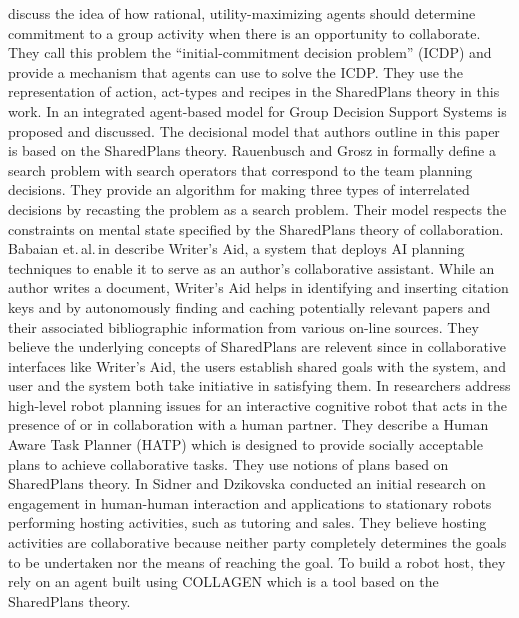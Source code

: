 \documentclass[12pt]{report}
\begin{document}
discuss the idea of how rational, utility-maximizing agents should determine
commitment to a group activity when there is an opportunity to collaborate. They
call this problem the ``initial-commitment decision problem'' (ICDP) and provide
a mechanism that agents can use to solve the ICDP. They use the representation
of action, act-types and recipes in the SharedPlans theory in this work. In
\cite{zamfirescu:gdss} an integrated agent-based model for Group Decision
Support Systems is proposed and discussed. The decisional model that authors
outline in this paper is based on the SharedPlans theory. Rauenbusch and Grosz
in \cite{rauenbusch:decision-making-planning} formally define a search problem
with search operators that correspond to the team planning decisions. They
provide an algorithm for making three types of interrelated decisions by
recasting the problem as a search problem. Their model respects the constraints
on mental state specified by the SharedPlans theory of collaboration. Babaian
et.\,al.\,in \cite{babaian:writers-assistant} describe Writer's Aid, a system
that deploys AI planning techniques to enable it to serve as an author's
collaborative assistant. While an author writes a document, Writer's Aid helps
in identifying and inserting citation keys and by autonomously finding and
caching potentially relevant papers and their associated bibliographic
information from various on-line sources. They believe the underlying concepts
of SharedPlans are relevent since in collaborative interfaces like Writer’s Aid,
the users establish shared goals with the system, and user and the system both
take initiative in satisfying them. In \cite{montreuil:planning-robot-activity}
researchers address high-level robot planning issues for an interactive
cognitive robot that acts in the presence of or in collaboration with a human
partner. They describe a Human Aware Task Planner (HATP) which is designed to
provide socially acceptable plans to achieve collaborative tasks. They use
notions of plans based on SharedPlans theory. In \cite{sidner:enagagement-robot}
Sidner and Dzikovska conducted an initial research on engagement in human-human
interaction and applications to stationary robots performing hosting activities,
such as tutoring and sales. They believe hosting activities are collaborative
because neither party completely determines the goals to be undertaken nor the
means of reaching the goal. To build a robot host, they rely on an agent built
using COLLAGEN which is a tool based on the SharedPlans theory.\\
\end{document}
